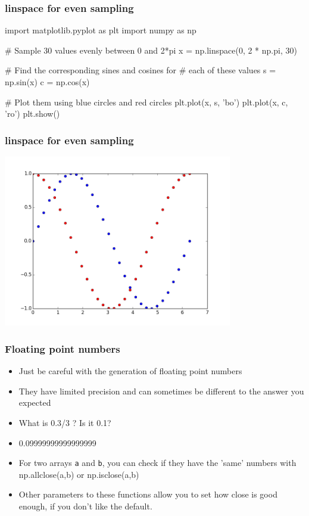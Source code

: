\documentclass{beamer}
\begin{document}
\begin{frame}[fragile]
\frametitle{linspace for even sampling}
\begin{code}
import matplotlib.pyplot as plt
import numpy as np

# Sample 30 values evenly between 0 and 2*pi
x = np.linspace(0, 2 * np.pi, 30)

# Find the corresponding sines and cosines for 
# each of these values
s = np.sin(x)
c = np.cos(x)

# Plot them using blue circles and red circles
plt.plot(x, s, 'bo')
plt.plot(x, c, 'ro')
plt.show()
\end{code}
\end{frame}

\begin{frame}[fragile]
\frametitle{linspace for even sampling}
\includegraphics[width=10cm]{sampled_sincos.png}
\end{frame}

\begin{frame}[fragile]
\frametitle{Floating point numbers}
\begin{itemize}
\item Just be careful with the generation of floating point numbers
\item They have limited precision and can sometimes be different to
  the answer you expected
\item What is 0.3/3 ? Is it 0.1?
\item 0.09999999999999999
\item For two arrays \texttt{a} and \texttt{b}, you can check if they have the 'same'
  numbers with np.allclose(a,b) or np.isclose(a,b)
\item Other parameters to these functions allow you to set how close is good enough, if
  you don't like the default.
\end{itemize}
\end{frame}
\end{document}
